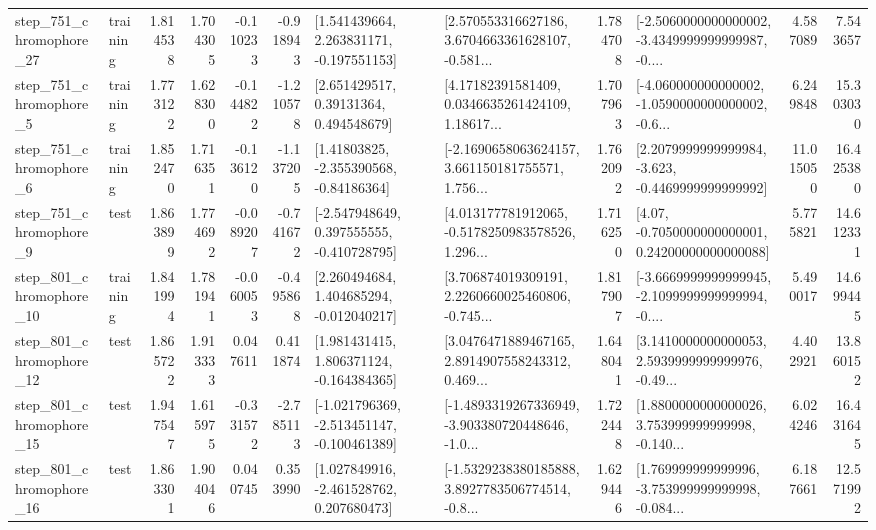 \begin{tabular}{llrrrrllrlrr}
  step\_751\_chromophore\_27 &  training &      1.814538 &    1.704305 &     -0.110233 & -0.918943 &    [1.541439664, 2.263831171, -0.197551153] &  [2.570553316627186, 3.6704663361628107, -0.581... &       1.784708 &  [-2.5060000000000002, -3.4349999999999987, -0.... &            4.587089 &          7.543657 \\
   step\_751\_chromophore\_5 &  training &      1.773122 &    1.628300 &     -0.144822 & -1.210578 &      [2.651429517, 0.39131364, 0.494548679] &  [4.17182391581409, 0.0346635261424109, 1.18617... &       1.707963 &  [-4.060000000000002, -1.0590000000000002, -0.6... &            6.249848 &         15.303030 \\
   step\_751\_chromophore\_6 &  training &      1.852470 &    1.716351 &     -0.136120 & -1.137205 &     [1.41803825, -2.355390568, -0.84186364] &  [-2.1690658063624157, 3.661150181755571, 1.756... &       1.762092 &  [2.2079999999999984, -3.623, -0.4469999999999992] &           11.015050 &         16.425380 \\
   step\_751\_chromophore\_9 &      test &      1.863899 &    1.774692 &     -0.089207 & -0.741672 &   [-2.547948649, 0.397555555, -0.410728795] &  [4.013177781912065, -0.5178250983578526, 1.296... &       1.716250 &   [4.07, -0.7050000000000001, 0.24200000000000088] &            5.775821 &         14.612331 \\
  step\_801\_chromophore\_10 &  training &      1.841994 &    1.781941 &     -0.060053 & -0.495868 &    [2.260494684, 1.404685294, -0.012040217] &  [3.706874019309191, 2.2260660025460806, -0.745... &       1.817907 &  [-3.6669999999999945, -2.1099999999999994, -0.... &            5.490017 &         14.699445 \\
  step\_801\_chromophore\_12 &      test &      1.865722 &    1.913333 &      0.047611 &  0.411874 &    [1.981431415, 1.806371124, -0.164384365] &  [3.0476471889467165, 2.8914907558243312, 0.469... &       1.648041 &  [3.1410000000000053, 2.5939999999999976, -0.49... &            4.402921 &         13.860152 \\
  step\_801\_chromophore\_15 &      test &      1.947547 &    1.615975 &     -0.331572 & -2.785113 &  [-1.021796369, -2.513451147, -0.100461389] &  [-1.4893319267336949, -3.903380720448646, -1.0... &       1.722448 &  [1.8800000000000026, 3.753999999999998, -0.140... &            6.024246 &         16.431645 \\
  step\_801\_chromophore\_16 &      test &      1.863301 &    1.904046 &      0.040745 &  0.353990 &    [1.027849916, -2.461528762, 0.207680473] &  [-1.5329238380185888, 3.8927783506774514, -0.8... &       1.629446 &  [1.769999999999996, -3.753999999999998, -0.084... &            6.187661 &         12.571992 \\

\end{tabular}
